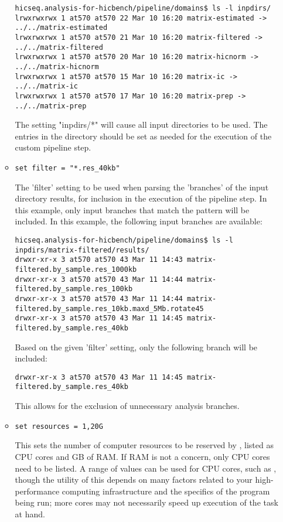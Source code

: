 \begin{enumerate}
\begin{itemize}
\begin{lstlisting}
hicseq.analysis-for-hicbench/pipeline/domains$ ls -l inpdirs/
lrwxrwxrwx 1 at570 at570 22 Mar 10 16:20 matrix-estimated -> ../../matrix-estimated
lrwxrwxrwx 1 at570 at570 21 Mar 10 16:20 matrix-filtered -> ../../matrix-filtered
lrwxrwxrwx 1 at570 at570 20 Mar 10 16:20 matrix-hicnorm -> ../../matrix-hicnorm
lrwxrwxrwx 1 at570 at570 15 Mar 10 16:20 matrix-ic -> ../../matrix-ic
lrwxrwxrwx 1 at570 at570 17 Mar 10 16:20 matrix-prep -> ../../matrix-prep
\end{lstlisting}
The setting "inpdirs/*" will cause all input directories to be used. The entries in the  directory should be set as needed for the execution of the custom pipeline step.
\item \begin{lstlisting}
set filter = "*.res_40kb"
\end{lstlisting}
The 'filter' setting to be used when parsing the 'branches' of the input directory results, for inclusion in the execution of the pipeline step. In this example, only input branches that match the pattern  will be included. In this example, the following input branches are available:
\begin{lstlisting}
hicseq.analysis-for-hicbench/pipeline/domains$ ls -l inpdirs/matrix-filtered/results/
drwxr-xr-x 3 at570 at570 43 Mar 11 14:43 matrix-filtered.by_sample.res_1000kb
drwxr-xr-x 3 at570 at570 43 Mar 11 14:44 matrix-filtered.by_sample.res_100kb
drwxr-xr-x 3 at570 at570 43 Mar 11 14:44 matrix-filtered.by_sample.res_10kb.maxd_5Mb.rotate45
drwxr-xr-x 3 at570 at570 43 Mar 11 14:45 matrix-filtered.by_sample.res_40kb
\end{lstlisting}
Based on the given 'filter' setting, only the following branch will be included:
\begin{lstlisting}
drwxr-xr-x 3 at570 at570 43 Mar 11 14:45 matrix-filtered.by_sample.res_40kb
\end{lstlisting}
This allows for the exclusion of unnecessary analysis branches. 
\item \begin{lstlisting}
set resources = 1,20G 
\end{lstlisting}
This sets the number of computer resources to be reserved by , listed as CPU cores and GB of RAM. If RAM is not a concern, only CPU cores need to be listed. A range of values can be used for CPU cores, such as , though the utility of this depends on many factors related to your high-performance computing infrastructure and the specifics of the program being run; more cores may not necessarily speed up execution of the task at hand. 

\end{itemize}
\end{enumerate}
